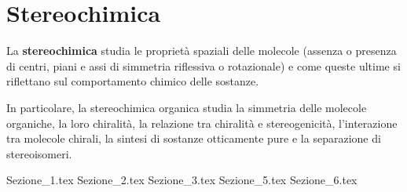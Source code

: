 \chapter{Stereochimica}
La \textbf{stereochimica} studia le proprietà spaziali delle molecole (assenza o presenza di centri, piani e assi di simmetria riflessiva o rotazionale) e come queste ultime si riflettano sul comportamento chimico delle sostanze.

In particolare, la stereochimica organica studia la simmetria delle molecole organiche, la loro chiralità, la relazione tra chiralità e stereogenicità, l'interazione tra molecole chirali, la sintesi di sostanze otticamente pure e la separazione di stereoisomeri.

{Sezione_1.tex} %
{Sezione_2.tex} %
{Sezione_3.tex} %
{Sezione_5.tex} %
{Sezione_6.tex} %